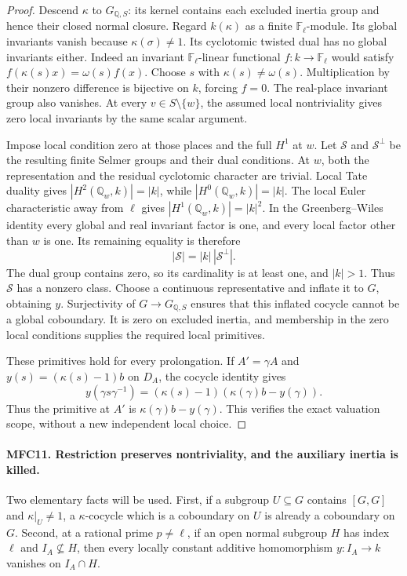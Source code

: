 \documentclass[11pt,a4paper]{article}
\numberwithin{equation}{section}
\theoremstyle{remark}\newtheorem{remark}[theorem]{Remark}
\begin{document}
\begin{proof}
Descend \(\kappa\) to \(G_{\mathbb Q,S}\): its kernel
contains each excluded inertia group and hence their closed
normal closure.  Regard \(k(\kappa)\) as a finite
\(\mathbb F_\ell\)-module.  Its global invariants vanish
because \(\kappa(\sigma)\ne1\).  Its cyclotomic twisted
dual has no global invariants either.  Indeed an invariant
\(\mathbb F_\ell\)-linear functional \(f:k\to\mathbb F_\ell\)
would satisfy \(f(\kappa(s)x)=\omega(s)f(x)\).
Choose \(s\) with \(\kappa(s)\ne\omega(s)\).  Multiplication
by their nonzero difference is bijective on \(k\), forcing
\(f=0\).  The real-place invariant group also vanishes.
At every \(v\in S\setminus\{w\}\), the assumed local
nontriviality gives zero local invariants by the same scalar
argument.

Impose local condition zero at those places and the full
\(H^1\) at \(w\).  Let \(\mathcal S\) and
\(\mathcal S^\perp\) be the resulting finite Selmer groups
and their dual conditions.  At \(w\), both the representation
and the residual cyclotomic character are trivial.  Local Tate
duality gives \(|H^2(\mathbb Q_w,k)|=|k|\), while
\(|H^0(\mathbb Q_w,k)|=|k|\).  The local Euler characteristic
away from \(\ell\) gives
\(|H^1(\mathbb Q_w,k)|=|k|^2\).
In the Greenberg--Wiles identity every global and real invariant
factor is one, and every local factor other than \(w\) is
one.  Its remaining equality is therefore
\[
                      |\mathcal S|=|k|\,|\mathcal S^\perp|.
                                                               \tag{MFC.25}
\]
The dual group contains zero, so its cardinality is at least
one, and \(|k|>1\).  Thus \(\mathcal S\) has a nonzero
class.  Choose a continuous representative and inflate it to
\(G\), obtaining \(y\).  Surjectivity of
\(G\to G_{\mathbb Q,S}\) ensures that this inflated cocycle
cannot be a global coboundary.  It is zero on excluded inertia,
and membership in the zero local conditions supplies the required
local primitives.

These primitives hold for every prolongation.  If
\(A'=\gamma A\) and \(y(s)=(\kappa(s)-1)b\) on \(D_A\),
the cocycle identity gives
\[
 y(\gamma s\gamma^{-1})
       =(\kappa(s)-1)(\kappa(\gamma)b-y(\gamma)).
\]
Thus the primitive at \(A'\) is
\(\kappa(\gamma)b-y(\gamma)\).  This verifies the exact
valuation scope, without a new independent local choice.
\end{proof}

\paragraph{MFC11. Restriction preserves nontriviality, and the auxiliary inertia is killed.}
\label{claim:MFC11}
Two elementary facts will be used.  First, if a subgroup
\(U\subseteq G\) contains \([G,G]\) and
\(\kappa|_U\ne1\), a \(\kappa\)-cocycle which is a
coboundary on \(U\) is already a coboundary on \(G\).
Second, at a rational prime \(p\ne\ell\), if an open
normal subgroup \(H\) has index \(\ell\) and
\(I_A\not\subseteq H\), then every locally constant additive
homomorphism \(y:I_A\to k\) vanishes on \(I_A\cap H\).
\end{document}
